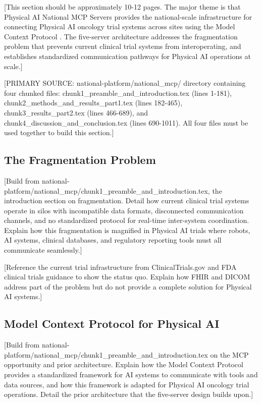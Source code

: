 
[This section should be approximately 10-12 pages. The major theme is that
Physical AI National MCP Servers \cite{national-mcp-paper} provides the
national-scale infrastructure for connecting Physical AI oncology trial
systems across sites using the Model Context Protocol \cite{mcp-protocol}.
The five-server architecture addresses the fragmentation problem that prevents
current clinical trial systems from interoperating, and establishes
standardized communication pathways for Physical AI operations at scale.]

[PRIMARY SOURCE: national-platform/national\_mcp/ directory containing four
chunked files: chunk1\_preamble\_and\_introduction.tex (lines 1-181),
chunk2\_methods\_and\_results\_part1.tex (lines 182-465),
chunk3\_results\_part2.tex (lines 466-689), and
chunk4\_discussion\_and\_conclusion.tex (lines 690-1011). All four files must
be used together to build this section.]

\subsection{The Fragmentation Problem}
\label{subsec:mcp-fragmentation}

[Build from national-platform/national\_mcp/chunk1\_preamble\_and\_introduction.tex,
the introduction section on fragmentation. Detail how current clinical trial
systems operate in silos with incompatible data formats, disconnected
communication channels, and no standardized protocol for real-time inter-system
coordination. Explain how this fragmentation is magnified in Physical AI
trials where robots, AI systems, clinical databases, and regulatory reporting
tools must all communicate seamlessly.]

[Reference the current trial infrastructure from ClinicalTrials.gov
\cite{clinicaltrials-gov} and FDA clinical trials guidance
\cite{fda-clinical-trials-guidance} to show the status quo. Explain how
FHIR \cite{hl7-fhir} and DICOM \cite{dicom} address part of the problem
but do not provide a complete solution for Physical AI systems.]

\subsection{Model Context Protocol for Physical AI}
\label{subsec:mcp-protocol}

[Build from national-platform/national\_mcp/chunk1\_preamble\_and\_introduction.tex
on the MCP opportunity and prior architecture. Explain how the Model Context
Protocol \cite{mcp-protocol} provides a standardized framework for AI
systems to communicate with tools and data sources, and how this framework is
adapted for Physical AI oncology trial operations. Detail the prior
architecture that the five-server design builds upon.]

